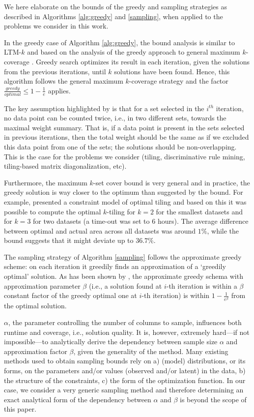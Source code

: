 We here elaborate on the bounds of the greedy and sampling strategies as described in Algorithms \ref{alg:greedy} and \ref{sampling}, when applied to the problems we consider in this work.

In the greedy case of Algorithm \ref{alg:greedy}, the bound analysis is similar to LTM-$k$ and based on the analysis of the greedy approach to general maximum $k$-coverage \citep{max_k_set_cover1, max_k_set_cover2}. Greedy search optimizes its result in each iteration, given the solutions from the previous iterations, until $k$ solutions have been found. Hence, this algorithm follows the general maximum $k$-coverage strategy and the factor $\frac{\textit{greedy}}{\textit{optimal}} \leq 1-\frac{1}{e}$ applies.

The key assumption highlighted by \citet{max_k_set_cover1} is that for a set selected in the $i^{th}$ iteration, no data point can be counted twice, i.e., in two different sets, towards the maximal weight summary. That is, if a data point is present in the sets selected in previous iterations, then the total weight should be the same as if we excluded this data point from one of the sets; the solutions should be non-overlapping. This is the case for the problems we consider (tiling, discriminative rule mining, tiling-based matrix diagonalization, etc).

Furthermore, the maximum $k$-set cover bound is very general and in practice, the greedy solution is way closer to the optimum than suggested by the bound. For example, \citet{GunsNR13} presented a constraint model of optimal tiling and based on this it was possible to compute the optimal $k$-tiling for $k=2$ for the smallest datasets and for $k=3$ for two datasets (a time-out was set to 6 hours). The average difference between optimal and actual area across all datasets was around $1\%$, while the bound suggests that it might deviate up to $36.7\%$.

The sampling strategy of Algorithm \ref{sampling} follows the approximate greedy scheme: on each iteration it greedily finds an approximation of a `greedily optimal' solution. As has been shown by \cite{max_k_set_cover1}, the approximate greedy schema with approximation parameter $\beta$ (i.e., a solution found at $i$-th iteration is within a $\beta$ constant factor of the greedy optimal one at $i$-th iteration) is within $1-\frac{1}{e^\beta}$ from the optimal solution.

$\alpha$, the parameter controlling the number of columns to sample, influences both runtime and coverage, i.e., solution quality. It is, however, extremely hard---if not impossible---to analytically derive the dependency between sample size $\alpha$ and approximation factor $\beta$, given the generality of the method. Many existing methods used to obtain sampling bounds rely on a) (model) distributions, or its forms, on the parameters and/or values (observed and/or latent) in the data, b) the structure of the constraints, c) the form of the optimization function. In our case, we consider a very generic sampling method and therefore determining an exact analytical form of the dependency between $\alpha$ and $\beta$ is beyond the scope of this paper.

